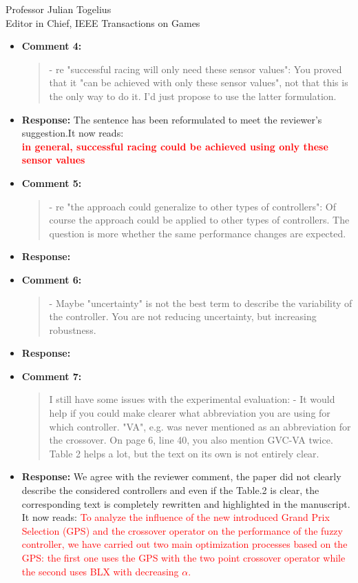 \documentclass[10pt]{letter} %
\begin{document}
\begin{letter}{Professor Julian Togelius \\ Editor in Chief, IEEE Transactions on Games}
\begin{enumerate}
\begin{itemize}
			\item {\bf Comment 4:}
				\begin{quote}	
					- re "successful racing will only need these sensor values": You proved that it "can be achieved with only these sensor values", not that this is the only way to do it. I'd just propose to use the latter formulation.
				\end{quote}	
			\item{\bf Response:} 
				The sentence has been reformulated to meet the reviewer's suggestion.It now reads:\\
			 \textcolor{red}{	{\bf in general, successful racing could be achieved using only these sensor values} }
			\item {\bf Comment 5:}
				\begin{quote}	
					- re "the approach could generalize to other types of controllers": Of course the approach could be applied to other types of controllers. The question is more whether the same performance changes are expected.
				\end{quote}	
			\item {\bf Response:} 
			\item {\bf Comment 6:}
				\begin{quote}	
					- Maybe "uncertainty" is not the best term to describe the variability of the controller. You are not reducing uncertainty, but increasing robustness.
				\end{quote}	
			\item {\bf Response:} 
			\item {\bf Comment 7:}
				\begin{quote}	
					I still have some issues with the experimental evaluation:
					- It would help if you could make clearer what abbreviation you are using for which controller. "VA", e.g. was never mentioned as an abbreviation for the crossover. On page 6, line 40, you also mention GVC-VA twice. Table 2 helps a lot, but the text on its own is not entirely clear.
				\end{quote}	
			\item {\bf Response:} 
			We agree with the reviewer comment, the paper did not clearly describe  the considered controllers and even if the Table.2 is clear, the corresponding text is completely rewritten and highlighted in the manuscript. It now reads:
			\textcolor{red}{
				To analyze the influence of the new introduced Grand Prix Selection (GPS) and the crossover operator on the performance of the fuzzy controller, we have carried out two main optimization processes based on the GPS: the first one uses the GPS with the two point crossover operator while the second uses  BLX with decreasing $\alpha$.
}
\end{itemize}
\end{enumerate}
\end{letter}
\end{document}
